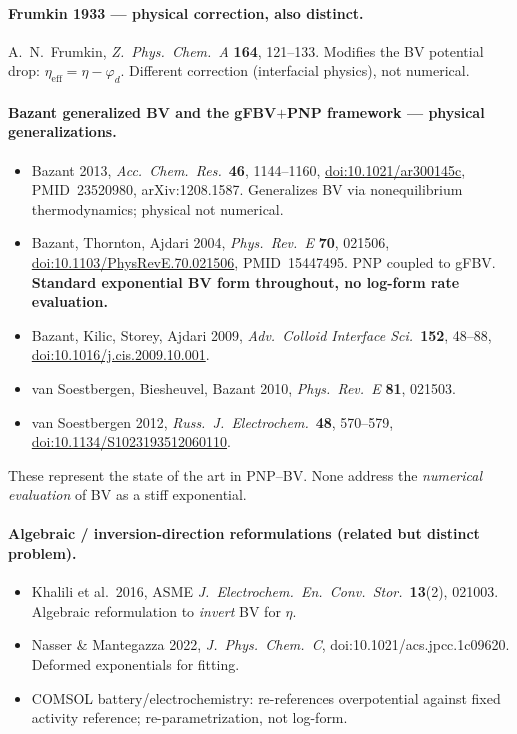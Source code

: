 \documentclass[11pt]{article}
\begin{document}
\paragraph{Frumkin 1933 --- physical correction, also distinct.}
A.~N.~Frumkin, \emph{Z.~Phys.~Chem.~A} \textbf{164}, 121--133. Modifies the BV
potential drop: $\eta_{\mathrm{eff}}=\eta-\varphi_d$. Different correction
(interfacial physics), not numerical.

\paragraph{Bazant generalized BV and the gFBV$+$PNP framework --- physical
generalizations.}
\begin{itemize}
\item Bazant 2013, \emph{Acc.~Chem.~Res.}\ \textbf{46}, 1144--1160,
      \href{https://doi.org/10.1021/ar300145c}{doi:10.1021/ar300145c},
      PMID~23520980, arXiv:1208.1587. Generalizes BV via nonequilibrium
      thermodynamics; physical not numerical.
\item Bazant, Thornton, Ajdari 2004, \emph{Phys.~Rev.~E} \textbf{70}, 021506,
      \href{https://doi.org/10.1103/PhysRevE.70.021506}{doi:10.1103/PhysRevE.70.021506},
      PMID~15447495. PNP coupled to gFBV. \textbf{Standard exponential BV form
      throughout, no log-form rate evaluation.}
\item Bazant, Kilic, Storey, Ajdari 2009, \emph{Adv.~Colloid Interface Sci.}\
      \textbf{152}, 48--88,
      \href{https://doi.org/10.1016/j.cis.2009.10.001}{doi:10.1016/j.cis.2009.10.001}.
\item van Soestbergen, Biesheuvel, Bazant 2010, \emph{Phys.~Rev.~E}
      \textbf{81}, 021503.
\item van Soestbergen 2012, \emph{Russ.~J.~Electrochem.}\ \textbf{48},
      570--579,
      \href{https://doi.org/10.1134/S1023193512060110}{doi:10.1134/S1023193512060110}.
\end{itemize}
These represent the state of the art in PNP--BV. None address the
\emph{numerical evaluation} of BV as a stiff exponential.

\paragraph{Algebraic / inversion-direction reformulations (related but distinct
problem).}
\begin{itemize}
\item Khalili et al.\ 2016, ASME \emph{J.~Electrochem.~En.~Conv.~Stor.}\
      \textbf{13}(2), 021003. Algebraic reformulation to \emph{invert} BV for
      $\eta$.
\item Nasser \& Mantegazza 2022, \emph{J.~Phys.~Chem.~C},
      doi:10.1021/acs.jpcc.1c09620. Deformed exponentials for fitting.
\item COMSOL battery/electrochemistry: re-references overpotential against
      fixed activity reference; re-parametrization, not log-form.
\end{itemize}
\end{document}
